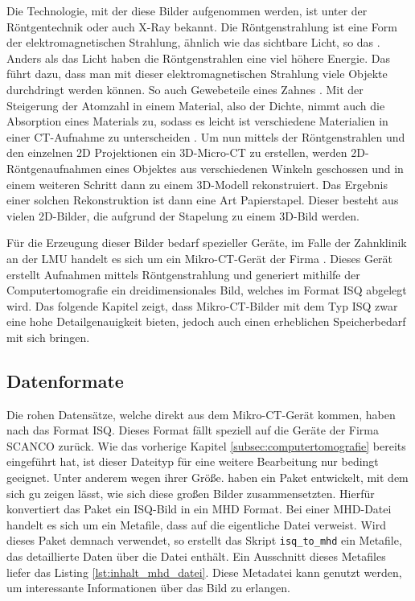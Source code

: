 Die Technologie, mit der diese Bilder aufgenommen werden, ist unter der Röntgentechnik
oder auch \ac{X-Ray} bekannt. Die Röntgenstrahlung ist eine Form der elektromagnetischen
Strahlung, ähnlich wie das sichtbare Licht, so das \citet[K.~1]{nib2024}. Anders
als das Licht haben die Röntgenstrahlen eine viel höhere Energie. Das führt dazu,
dass man mit dieser elektromagnetischen Strahlung viele Objekte durchdringt werden
können. So auch Gewebeteile eines Zahnes \citep[vgl.][K.~1]{nib2024}. Mit der
Steigerung der Atomzahl in einem Material, also der Dichte, nimmt auch die
Absorption eines Materials zu, sodass es leicht ist verschiedene Materialien in einer
\ac{CT}-Aufnahme zu unterscheiden \citep[vgl.][K.~1]{nib2024}. Um nun mittels
der Röntgenstrahlen und den einzelnen \ac{2D} Projektionen ein \ac{3D}-Micro-\ac{CT}
zu erstellen, werden 2D-Röntgenaufnahmen eines Objektes aus verschiedenen
Winkeln geschossen und in einem weiteren Schritt dann zu einem \ac{3D}-Modell rekonstruiert.
Das Ergebnis einer solchen Rekonstruktion ist dann eine Art Papierstapel. Dieser
besteht aus vielen 2D-Bilder, die aufgrund der Stapelung zu einem \ac{3D}-Bild werden.

Für die Erzeugung dieser Bilder bedarf spezieller Geräte, im Falle der
Zahnklinik an der \ac{LMU} handelt es sich um ein Mikro-\ac{CT}-Gerät der Firma
\citet{scanco2024}. Dieses Gerät erstellt Aufnahmen mittels Röntgenstrahlung und
generiert mithilfe der Computertomografie ein dreidimensionales Bild, welches im
Format \ac{ISQ} abgelegt wird. Das folgende Kapitel zeigt, dass Mikro-\ac{CT}-Bilder
mit dem Typ \ac{ISQ} zwar eine hohe Detailgenauigkeit bieten, jedoch auch einen erheblichen
Speicherbedarf mit sich bringen.

\subsection{Datenformate}
\label{subsec:datensätze} Die rohen Datensätze, welche direkt aus dem Mikro-\ac{CT}-Gerät
kommen, haben nach \citet{scanco2024} das Format \ac{ISQ}. Dieses Format fällt speziell
auf die Geräte der Firma SCANCO zurück. Wie das vorherige Kapitel
\ref{subsec:computertomografie} bereits eingeführt hat, ist dieser Dateityp für eine
weitere Bearbeitung nur bedingt geeignet. Unter anderem wegen ihrer Größe. \citet[S.~118-119]{RoeschKunzelmann2018}
haben ein Paket entwickelt, mit dem sich gu zeigen lässt, wie sich diese großen
Bilder zusammensetzten. Hierfür konvertiert das Paket ein \ac{ISQ}-Bild in ein
\ac{MHD} Format. Bei einer \ac{MHD}-Datei handelt es sich um ein Metafile, dass
auf die eigentliche Datei verweist. Wird dieses Paket demnach verwendet, so
erstellt das Skript \texttt{isq\_to\_mhd} ein Metafile, das detaillierte Daten
über die Datei enthält. Ein Ausschnitt dieses Metafiles liefer das Listing \ref{lst:inhalt_mhd_datei}.
Diese Metadatei kann genutzt werden, um interessante Informationen über das Bild
zu erlangen.

